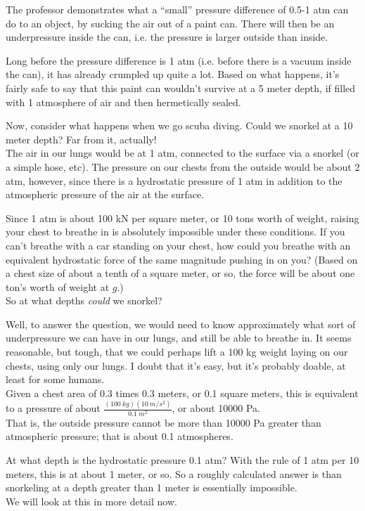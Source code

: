 The professor demonstrates what a ``small'' pressure difference of 0.5-1 atm can do to an object, by sucking the air out of a paint can. There will then be an underpressure inside the can, i.e. the pressure is larger outside than inside.

Long before the pressure difference is 1 atm (i.e. before there is a vacuum inside the can), it has already crumpled up quite a lot. Based on what happens, it's fairly safe to say that this paint can wouldn't survive at a 5 meter depth, if filled with 1 atmosphere of air and then hermetically sealed. 

Now, consider what happens when we go scuba diving. Could we snorkel at a 10 meter depth? Far from it, actually!\\
The air in our lungs would be at 1 atm, connected to the surface via a snorkel (or a simple hose, etc). The pressure on our chests from the outside would be about 2 atm, however, since there is a hydrostatic pressure of 1 atm in addition to the atmospheric pressure of the air at the surface.

Since 1 atm is about 100 kN per square meter, or 10 tons worth of weight, raising your chest to breathe in is absolutely impossible under these conditions. If you can't breathe with a car standing on your chest, how could you breathe with an equivalent hydrostatic force of the same magnitude pushing in on you? (Based on a chest size of about a tenth of a square meter, or so, the force will be about one ton's worth of weight at $g$.)\\
So at what depths \emph{could} we snorkel?

Well, to answer the question, we would need to know approximately what sort of underpressure we can have in our lungs, and still be able to breathe in. It seems reasonable, but tough, that we could perhaps lift a 100 kg weight laying on our chests, using only our lungs. I doubt that it's easy, but it's probably doable, at least for some humans.\\
Given a chest area of 0.3 times 0.3 meters, or 0.1 square meters, this is equivalent to a pressure of about $\displaystyle \frac{(\SI{100}{kg})(\SI{10}{m/s^2})}{\SI{0.1}{m^2}}$, or about 10000 Pa.\\
That is, the outside pressure cannot be more than 10000 Pa greater than atmospheric pressure; that is about 0.1 atmospheres.

At what depth is the hydrostatic pressure 0.1 atm? With the rule of 1 atm per 10 meters, this is at about 1 meter, or so. So a roughly calculated answer is than snorkeling at a depth greater than 1 meter is essentially impossible.\\
We will look at this in more detail now.


